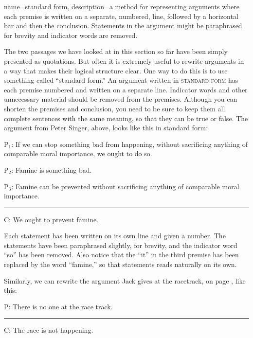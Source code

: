 {
name=standard form,
description={a method for representing arguments where each premise is written on a separate, numbered, line, followed by a horizontal bar and then the conclusion. Statements in the argument might be paraphrased for brevity and indicator words are removed.}
}


The two passages we have looked at in this section so far have been simply presented as quotations. But often it is extremely useful to rewrite arguments in a way that makes their logical structure clear. One way to do this is to use something called ``standard form.''   An argument written in \textsc{\gls{standard form}} \label{def:canonical_form}has each premise numbered and written on a separate line. Indicator words and other unnecessary material should be removed from the premises. Although you can shorten the premises and conclusion, you need to be sure to keep them all complete sentences with the same meaning, so that they can be true or false. The argument from Peter Singer, above, looks like this in standard form:

\begin{earg}
\item[P$_1$:] If we can stop something bad from happening, without sacrificing anything of comparable moral importance, we ought to do so. 
\item[P$_2$:] Famine is something bad.
\item[P$_3$:] Famine can be prevented without sacrificing anything of comparable moral importance.
\vspace{-.5em}
\item [] \rule{0.9\linewidth}{.5pt} 
\item[C:] We ought to prevent famine.
\end{earg} 

Each statement has been written on its own line and given a number. The statements have been paraphrased slightly, for brevity, and the indicator word ``so'' has been removed. Also notice that the ``it'' in the third premise has been replaced by the word ``famine,'' so that statements reads naturally on its own.  

Similarly, we can rewrite the argument Jack gives at the racetrack, on page \pageref{racetrack}, like this:

\begin{earg}
\item[P:] There is no one at the race track.
\vspace{-.5em}
\item [] \rule{0.4\linewidth}{.5pt} 
\item[C:] The race is not happening. 
\end{earg} 

